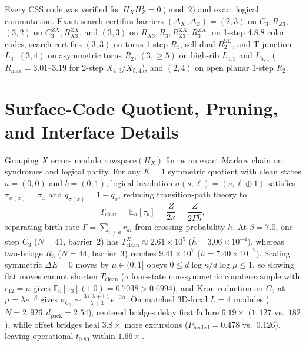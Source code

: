 \documentclass[aps,prx,reprint,superscriptaddress,nofootinbib,floatfix]{revtex4-2}
\begin{document}
Every CSS code was verified for $H_X H_Z^T = 0 \pmod 2$ and exact logical commutation. Exact search certifies barriers $(\Delta_X, \Delta_Z) = (2, 3)$ on $C_3, R_{Z3}$, $(3, 2)$ on $C_3^{ZX}, R_{X3}^{ZX}$, and $(3, 3)$ on $R_{X3}, R_3, R_{Z3}^{ZX}, R_3^{ZX}$; on 1-step 4.8.8 color codes, search certifies $(3, 3)$ on torus 1-step $R_1$, self-dual $R_2^{\mathrm{SD}}$, and T-junction $L_3$, $(3, 4)$ on asymmetric torus $R_2$, $(3, {\ge}5)$ on high-rib $L_{4,3}$ and $L_{5,4}$ ($R_{\max} = 3.01\text{--}3.19$ for 2-step $X_{4,3}/X_{5,4}$), and $(2, 4)$ on open planar 1-step $R_2$.

\section{Surface-Code Quotient, Pruning, and Interface Details}
\label{app:surface_diagnostics}

Grouping $X$ errors modulo $\mathrm{rowspace}(H_X)$ forms an exact Markov chain on syndromes and logical parity. For any $K = 1$ symmetric quotient with clean states $a = (0, 0)$ and $b = (0, 1)$, logical involution $\sigma(s, \ell) = (s, \ell \oplus 1)$ satisfies $\pi_{\sigma(x)} = \pi_x$ and $q_{\sigma(x)} = 1 - q_x$, reducing transition-path theory \cite{metzner2009tpt} to
\begin{equation}
  T_{\mathrm{clean}} = \mathbb{E}_a[\tau_b] = \frac{Z}{2\kappa} = \frac{Z}{2\Gamma \bar{h}},
  \label{eq:tclean_identity}
\end{equation}
separating birth rate $\Gamma = \sum_{i \ne a} r_{ai}$ from crossing probability $\bar{h}$. At $\beta = 7.0$, one-step $C_3$ ($N = 41$, barrier~$2$) has $T_{\mathrm{clean}}^X \approx 2.61 \times 10^5$ ($\bar{h} = 3.06 \times 10^{-4}$), whereas two-bridge $R_3$ ($N = 44$, barrier~$3$) reaches $9.41 \times 10^7$ ($\bar{h} = 7.40 \times 10^{-7}$). Scaling symmetric $\Delta E = 0$ moves by $\mu \in (0, 1]$ obeys $0 \le d\log\kappa / d\log\mu \le 1$, so slowing flat moves cannot shorten $T_{\mathrm{clean}}$ (a four-state non-symmetric counterexample with $c_{12} = \mu$ gives $\mathbb{E}_0[\tau_3](1.0) = 0.7038 > 0.6994$), and Kron reduction \cite{dorfler2011kron} on $C_3$ at $\mu = \lambda e^{-\beta}$ gives $\kappa_{C_3} \sim \frac{3(\lambda + 1)}{\lambda + 3}e^{-2\beta}$. On matched 3D-local $L = 4$ modules ($N = 2{,}926, d_{\mathrm{pack}} = 2.54$), centered bridges delay first failure $6.19\times$ ($1{,}127$ vs.\ $182$), while offset bridges heal $3.8\times$ more excursions ($P_{\mathrm{healed}} = 0.478$ vs.\ $0.126$), leaving operational $t_{0.80}$ within $1.66\times$.
\end{document}
